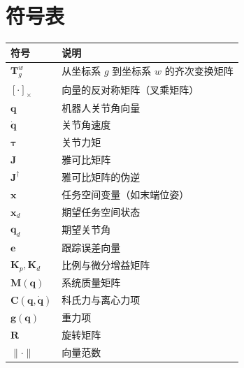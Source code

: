 \section*{符号表}

\begin{table}[htbp]
	\centering
	\renewcommand{\arraystretch}{1.3}
	\begin{tabular}{ll}
		\toprule
		符号 & 说明 \\
		\midrule
		
		$\mathbf{T}_{g}^{w}$ & 从坐标系 $g$ 到坐标系 $w$ 的齐次变换矩阵 \\
		
		$[\cdot]_\times$ & 向量的反对称矩阵（叉乘矩阵） \\
		
		$\mathbf{q}$ & 机器人关节角向量 \\
		
		$\dot{\mathbf{q}}$ & 关节角速度 \\
		
		$\boldsymbol{\tau}$ & 关节力矩 \\
		
		$\mathbf{J}$ & 雅可比矩阵 \\
		
		$\mathbf{J}^\dagger$ & 雅可比矩阵的伪逆 \\
		
		$\mathbf{x}$ & 任务空间变量（如末端位姿） \\
		
		$\mathbf{x}_d$ & 期望任务空间状态 \\
		
		$\mathbf{q}_d$ & 期望关节角 \\
		
		$\mathbf{e}$ & 跟踪误差向量 \\
		
		$\mathbf{K}_p, \mathbf{K}_d$ & 比例与微分增益矩阵 \\
		
		$\mathbf{M}(\mathbf{q})$ & 系统质量矩阵 \\
		
		$\mathbf{C}(\mathbf{q},\dot{\mathbf{q}})$ & 科氏力与离心力项 \\
		
		$\mathbf{g}(\mathbf{q})$ & 重力项 \\
		
		$\mathbf{R}$ & 旋转矩阵 \\
		
		$\|\cdot\|$ & 向量范数 \\
		

\end{tabular}
\end{table}
